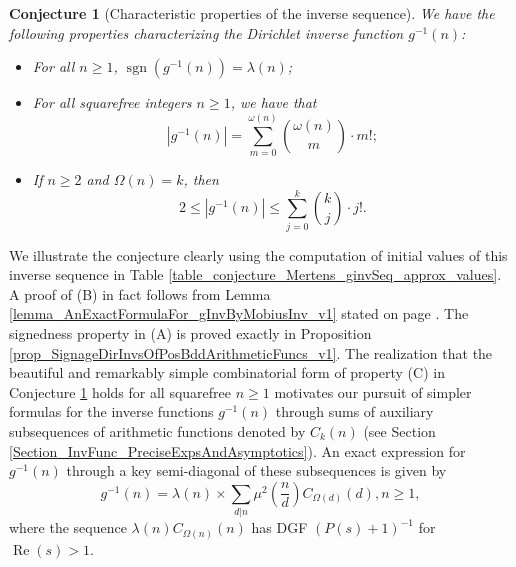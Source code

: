 \documentclass[11pt,reqno,a4letter]{article}
\numberwithin{figure}{section}
\numberwithin{table}{section}
\theoremstyle{plain}
\newtheorem{conjecture}[theorem]{Conjecture}
\numberwithin{theorem}{section}
\theoremstyle{definition}
\newcommand{\NBRef}[1]{}
\renewcommand{\Re}{\operatorname{Re}}
\begin{document}
\NBRef{A01-2020-04-26}
\begin{conjecture}[Characteristic properties of the inverse sequence] 
\label{lemma_gInv_MxExample} 
We have the following properties characterizing the 
Dirichlet inverse function $g^{-1}(n)$: 
\begin{itemize} 

\item[\textbf{(A)}] For all $n \geq 1$, $\operatorname{sgn}(g^{-1}(n)) = \lambda(n)$; 
\item[\textbf{(B)}] For all squarefree integers $n \geq 1$, we have that 
     \[
     |g^{-1}(n)| = \sum_{m=0}^{\omega(n)} \binom{\omega(n)}{m} \cdot m!; 
     \]
\item[\textbf{(C)}] If $n \geq 2$ and $\Omega(n) = k$, then 
     \[
     2 \leq |g^{-1}(n)| \leq \sum_{j=0}^{k} \binom{k}{j} \cdot j!. 
     \]
\end{itemize} 
\end{conjecture} 

We illustrate the conjecture clearly using the computation of initial values of 
this inverse sequence in 
Table \ref{table_conjecture_Mertens_ginvSeq_approx_values}. 
A proof of (B) in fact follows from 
Lemma \ref{lemma_AnExactFormulaFor_gInvByMobiusInv_v1} 
stated on page \pageref{lemma_AnExactFormulaFor_gInvByMobiusInv_v1}. 
The signedness property in (A) is proved exactly in 
Proposition \ref{prop_SignageDirInvsOfPosBddArithmeticFuncs_v1}. 
The realization that the beautiful and remarkably simple combinatorial form of property (C) 
in Conjecture \ref{lemma_gInv_MxExample} holds for all squarefree $n \geq 1$ 
motivates our pursuit of simpler formulas for the inverse functions $g^{-1}(n)$ 
through sums of auxiliary subsequences of arithmetic functions denoted by $C_k(n)$  
(see Section \ref{Section_InvFunc_PreciseExpsAndAsymptotics}). 
An exact expression for $g^{-1}(n)$ through a key semi-diagonal of these subsequences 
is given by 
\[
g^{-1}(n) = \lambda(n) \times \sum_{d|n} \mu^2\left(\frac{n}{d}\right) C_{\Omega(d)}(d), n \geq 1,  
\]
where the sequence $\lambda(n) C_{\Omega(n)}(n)$ has DGF $(P(s)+1)^{-1}$ for $\Re(s) > 1$. 
\end{document}
